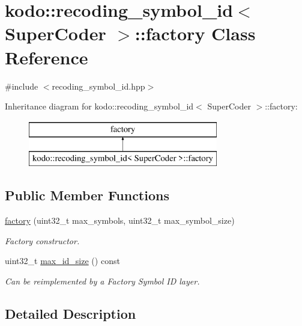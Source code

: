 \hypertarget{classkodo_1_1recoding__symbol__id_1_1factory}{\section{kodo\-:\-:recoding\-\_\-symbol\-\_\-id$<$ Super\-Coder $>$\-:\-:factory Class Reference}
\label{classkodo_1_1recoding__symbol__id_1_1factory}
}


{\ttfamily \#include $<$recoding\-\_\-symbol\-\_\-id.\-hpp$>$}

Inheritance diagram for kodo\-:\-:recoding\-\_\-symbol\-\_\-id$<$ Super\-Coder $>$\-:\-:factory\-:\begin{figure}[H]
\begin{center}
\leavevmode
\includegraphics[height=2.000000cm]{classkodo_1_1recoding__symbol__id_1_1factory}
\end{center}
\end{figure}
\subsection*{Public Member Functions}
\begin{DoxyCompactItemize}
\item 
\hyperlink{classkodo_1_1recoding__symbol__id_1_1factory_a49465da0fbf5ad59589ff45e738424b6}{factory} (uint32\-\_\-t max\-\_\-symbols, uint32\-\_\-t max\-\_\-symbol\-\_\-size)
\begin{DoxyCompactList}\small\item\em Factory constructor. \end{DoxyCompactList}\item 
uint32\-\_\-t \hyperlink{classkodo_1_1recoding__symbol__id_1_1factory_ae0fdcfca03d97f502f5266142d112921}{max\-\_\-id\-\_\-size} () const 
\begin{DoxyCompactList}\small\item\em Can be reimplemented by a Factory Symbol I\-D layer. \end{DoxyCompactList}\end{DoxyCompactItemize}


\subsection{Detailed Description}
